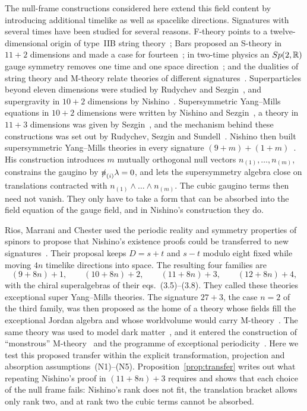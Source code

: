 The null-frame constructions considered here extend this field content by introducing additional timelike as well as spacelike directions. Signatures with several times have been studied for several reasons. F-theory points to a twelve-dimensional origin of type~IIB string theory~\cite{Vafa1996}; Bars proposed an S-theory in $11+2$ dimensions and made a case for fourteen~\cite{Bars1997,Bars1997b}; in two-time physics an $Sp(2,\mathbb{R})$ gauge symmetry removes one time and one space direction~\cite{BarsKounnas1997,BarsDelidumanAndreev1998,Bars2000}; and the dualities of string theory and M-theory relate theories of different signatures~\cite{Hull1998,Hull1998b}. Superparticles beyond eleven dimensions were studied by Rudychev and Sezgin~\cite{RudychevSezgin1997}, and supergravity in $10+2$ dimensions by Nishino~\cite{Nishino1998b}. Supersymmetric Yang--Mills equations in $10+2$ dimensions were written by Nishino and Sezgin~\cite{NishinoSezgin1996}, a theory in $11+3$ dimensions was given by Sezgin~\cite{Sezgin1997}, and the mechanism behind these constructions was set out by Rudychev, Sezgin and Sundell~\cite{RudychevSezginSundell1998}. Nishino then built supersymmetric Yang--Mills theories in every signature $(9+m)+(1+m)$~\cite{Nishino1998}. His construction introduces $m$ mutually orthogonal null vectors $n_{(1)},\dots,n_{(m)}$, constrains the gaugino by $\slashed{n}_{(i)}\lambda=0$, and lets the supersymmetry algebra close on translations contracted with $n_{(1)}\wedge\dots\wedge n_{(m)}$. The cubic gaugino terms then need not vanish. They only have to take a form that can be absorbed into the field equation of the gauge field, and in Nishino's construction they do.

Rios, Marrani and Chester used the periodic reality and symmetry properties of spinors to propose that Nishino's existence proofs could be transferred to new signatures~\cite[Sec.~III.A]{RiosMarraniChester2019}. Their proposal keeps $D=s+t$ and $s-t$ modulo eight fixed while moving $4n$ timelike directions into space. The resulting four families are
\begin{equation}
\label{eq:families}
(9+8n)+1,\qquad (10+8n)+2,\qquad (11+8n)+3,\qquad (12+8n)+4 ,
\end{equation}
with the chiral superalgebras of their eqs.~(3.5)--(3.8). They called these theories exceptional super Yang--Mills theories. The signature $27+3$, the case $n=2$ of the third family, was then proposed as the home of a theory whose fields fill the exceptional Jordan algebra and whose worldvolume would carry M-theory~\cite{RiosMarraniChester2020}. The same theory was used to model dark matter~\cite{PaduroiuRiosMarraniChester2021}, and it entered the construction of ``monstrous'' M-theory~\cite{MarraniRiosChester2023} and the programme of exceptional periodicity~\cite{TruiniMarraniRiosdeGraaf2025}. Here we test this proposed transfer within the explicit transformation, projection and absorption assumptions~(N1)--(N5). Proposition~\ref{prop:transfer} writes out what repeating Nishino's proof in $(11+8n)+3$ requires and shows that each choice of the null frame fails: Nishino's rank does not fit, the translation bracket allows only rank two, and at rank two the cubic terms cannot be absorbed.

